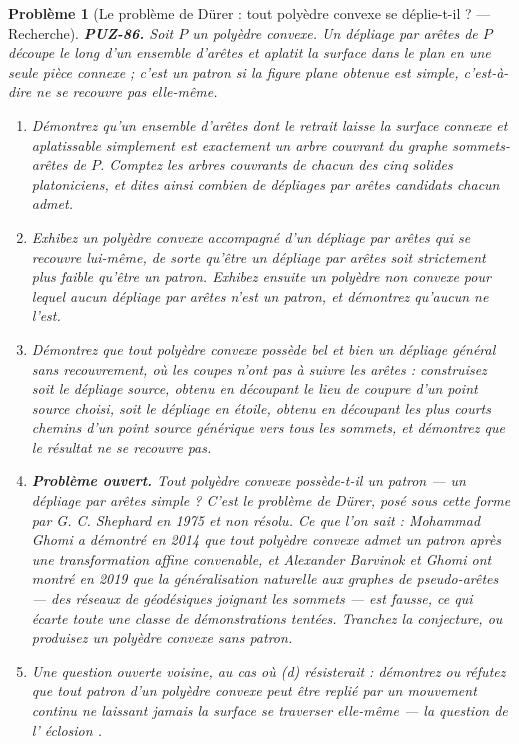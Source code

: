 \documentclass[11pt]{article}
\newtheorem{problem}{Problème}
\begin{document}
\begin{problem}[{Le problème de Dürer : tout polyèdre convexe se déplie-t-il ? --- Recherche}]
\textbf{PUZ-86.} Soit $ P $ un polyèdre convexe. Un \textit{dépliage par arêtes} de
$ P $ découpe le long d'un ensemble d'arêtes et aplatit la surface dans le plan en une seule
pièce connexe ; c'est un \textit{patron} si la figure plane obtenue est simple, c'est-à-dire ne
se recouvre pas elle-même.
\begin{enumerate}
\item[(a)] Démontrez qu'un ensemble d'arêtes dont le retrait laisse la surface connexe et
aplatissable simplement est exactement un arbre couvrant du graphe sommets-arêtes de $ P $.
Comptez les arbres couvrants de chacun des cinq solides platoniciens, et dites ainsi combien
de dépliages par arêtes candidats chacun admet.
\item[(b)] Exhibez un polyèdre convexe accompagné d'un dépliage par arêtes qui se recouvre lui-même,
de sorte qu'être un dépliage par arêtes soit strictement plus faible qu'être un patron.
Exhibez ensuite un polyèdre \textit{non convexe} pour lequel \textit{aucun} dépliage par arêtes
n'est un patron, et démontrez qu'aucun ne l'est.
\item[(c)] Démontrez que tout polyèdre convexe possède bel et bien un dépliage \textit{général} sans
recouvrement, où les coupes n'ont pas à suivre les arêtes : construisez soit le dépliage
source, obtenu en découpant le lieu de coupure d'un point source choisi, soit le dépliage en
étoile, obtenu en découpant les plus courts chemins d'un point source générique vers tous les
sommets, et démontrez que le résultat ne se recouvre pas.
\item[(d)] \textbf{Problème ouvert.} Tout polyèdre convexe possède-t-il un patron --- un dépliage par
arêtes simple ? C'est le problème de Dürer, posé sous cette forme par G. C. Shephard en 1975
et non résolu. Ce que l'on sait : Mohammad Ghomi a démontré en 2014 que tout polyèdre convexe
admet un patron après une transformation affine convenable, et Alexander Barvinok et Ghomi ont
montré en 2019 que la généralisation naturelle aux graphes de pseudo-arêtes --- des réseaux de
géodésiques joignant les sommets --- est fausse, ce qui écarte toute une classe de démonstrations
tentées. Tranchez la conjecture, ou produisez un polyèdre convexe sans patron.
\item[(e)] Une question ouverte voisine, au cas où (d) résisterait : démontrez ou réfutez que tout
patron d'un polyèdre convexe peut être replié par un mouvement continu ne laissant jamais la
surface se traverser elle-même --- la question de l'\og{} éclosion \fg{}.
\end{enumerate}

\end{problem}
\end{document}
